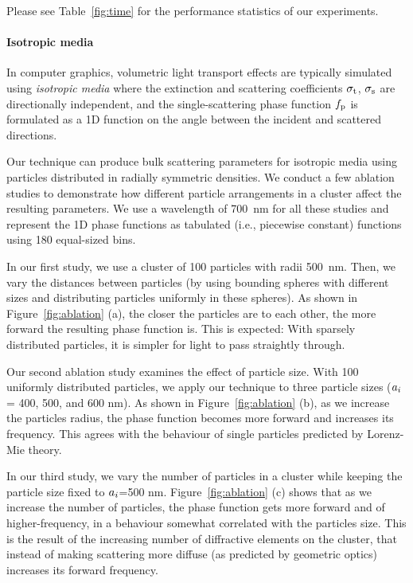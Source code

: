 Please see Table~\ref{fig:time} for the performance statistics of our experiments. 






\paragraph{Isotropic media}
In computer graphics, volumetric light transport effects are typically simulated using \emph{isotropic media} where the extinction and scattering coefficients $\sigma_\mathrm{t}$, $\sigma_\mathrm{s}$ are directionally independent, and the single-scattering phase function $f_\mathrm{p}$ is formulated as a 1D function on the angle between the incident and scattered directions.

Our technique can produce bulk scattering parameters for isotropic media using particles distributed in radially symmetric densities.
We conduct a few ablation studies to demonstrate how different particle arrangements in a cluster affect the resulting parameters.
We use a wavelength of 700~nm for all these studies and represent the 1D phase functions as tabulated (i.e., piecewise constant) functions using 180 equal-sized bins.

In our first study, we use a cluster of 100 particles with radii 500~nm. Then, we vary the distances between particles (by using bounding spheres with different sizes and distributing particles uniformly in these spheres).
As shown in Figure~\ref{fig:ablation} (a), the closer the particles are to each other, the more forward the resulting phase function is.
This is expected: With sparsely distributed particles, it is simpler for light to pass straightly through.

Our second ablation study examines the effect of particle size. With 100 uniformly distributed particles, we apply our technique to three particle sizes ($a_i$= 400, 500, and 600 nm).
As shown in Figure~\ref{fig:ablation} (b), as we increase the particles radius, the phase function becomes more forward and increases its frequency. This agrees with the behaviour of single particles predicted by Lorenz-Mie theory. 

In our third study, we vary the number of particles in a cluster while keeping the particle size fixed to $a_i$=500 nm.
Figure~\ref{fig:ablation} (c) shows that as we increase the number of particles, the phase function gets more forward and of higher-frequency, in a behaviour somewhat correlated with the particles size. This is the result of the increasing number of diffractive elements on the cluster, that instead of making scattering more diffuse (as predicted by geometric optics) increases its forward frequency. 

